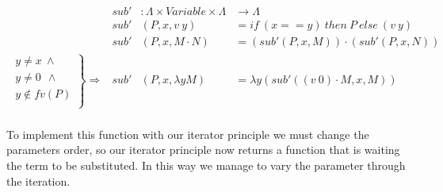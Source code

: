 \documentclass{article}
\begin{document}
\[
\begin{array}{rrll}
&sub' &: \Lambda \times Variable \times  \Lambda &   \rightarrow  \Lambda  \\
&sub' &(P , x , v\ y)         &= if\ (x == y)\ then\ P\ else\ (v\ y)   \\
&sub' &(P , x , M \cdot N)    &= (sub' (P , x , M)) \cdot (sub' (P , x , N)) \\
\left. 
\begin{array}{c}
y \neq x  \ \wedge \\
 y \neq 0\ \  \wedge \\
 y \not\in fv(P) \\
\end{array} \right\} \Rightarrow&sub' &(P , x , \lambda y M)   &= \lambda y (sub' ((v\ 0) \cdot M , x , M)) \\
\end{array} \]


To implement this function with our iterator principle we must change the parameters order, so our iterator principle now returns a function that is waiting the term to be substituted. In this way we manage to vary the parameter through the iteration.

 \hspace{5px}


\end{document}
